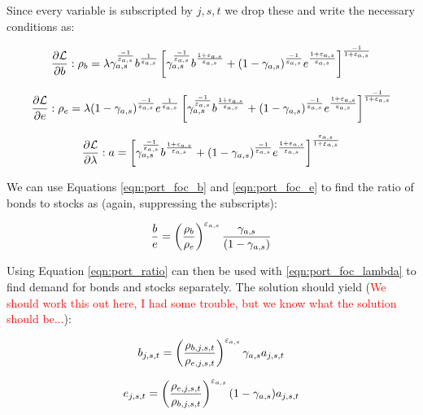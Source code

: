Since every variable is subscripted by $j,s,t$ we drop these and write the necessary conditions as:

\begin{equation}
\label{eqn:port_foc_b}
\frac{\partial \mathcal{L}}{\partial b}: \rho_{b} = \lambda \gamma_{a,s}^{\frac{-1}{\varepsilon_{a,s}}}b^{\frac{1}{\varepsilon_{a,s}}}\left[\gamma_{a,s}^{\frac{-1}{\varepsilon_{a,s}}}b^{\frac{1+\varepsilon_{a.s}}{\varepsilon_{a,s}}}+(1-\gamma_{a,s})^{\frac{-1}{\varepsilon_{a,s}}}e^{\frac{1+\varepsilon_{a,s}}{\varepsilon_{a,s}}}\right]^{\frac{-1}{1+\varepsilon_{a,s}}}
\end{equation}

\begin{equation}
\label{eqn:port_foc_e}
\frac{\partial \mathcal{L}}{\partial e}: \rho_{e} = \lambda (1- \gamma_{a,s})^{\frac{-1}{\varepsilon_{a,s}}}e^{\frac{1}{\varepsilon_{a,s}}}\left[\gamma_{a,s}^{\frac{-1}{\varepsilon_{a,s}}}b^{\frac{1+\varepsilon_{a.s}}{\varepsilon_{a,s}}}+(1-\gamma_{a,s})^{\frac{-1}{\varepsilon_{a,s}}}e^{\frac{1+\varepsilon_{a,s}}{\varepsilon_{a,s}}}\right]^{\frac{-1}{1+\varepsilon_{a,s}}}
\end{equation}
       
\begin{equation}
\label{eqn:port_foc_lambda}
\frac{\partial \mathcal{L}}{\partial \lambda}: a = \left[\gamma_{a,s}^{\frac{-1}{\varepsilon_{a,s}}}b^{\frac{1+\varepsilon_{a.s}}{\varepsilon_{a,s}}}+(1-\gamma_{a,s})^{\frac{-1}{\varepsilon_{a,s}}}e^{\frac{1+\varepsilon_{a,s}}{\varepsilon_{a,s}}}\right]^{\frac{\varepsilon_{a,s}}{1+\varepsilon_{a,s}}}
\end{equation}
              
We can use Equations \ref{eqn:port_foc_b} and \ref{eqn:port_foc_e} to find the ratio of bonds to stocks as (again, suppressing the subscripts):

\begin{equation}
\label{eqn:port_ratio}
\frac{b}{e}= \left(\frac{\rho_{b}}{\rho_{e}}\right)^{\varepsilon_{a,s}}\frac{\gamma_{a,s}}{(1-\gamma_{a,s})}
\end{equation}
     
Using Equation \ref{eqn:port_ratio} can then be used with \ref{eqn:port_foc_lambda} to find demand for bonds and stocks separately.  The solution should yield (\textcolor{red}{We should work this out here, I had some trouble, but we know what the solution should be...}):

\begin{equation}
\label{eqn:bond_demand}
b_{j,s,t} = \left(\frac{\rho_{b,j,s,t}}{\rho_{e,j,s,t}}\right)^{\varepsilon_{a,s}}\gamma_{a,s}a_{j,s,t}
\end{equation}     

\begin{equation}
\label{eqn:equity_demand}
e_{j,s,t} = \left(\frac{\rho_{e,j,s,t}}{\rho_{b,j,s,t}}\right)^{\varepsilon_{a,s}}(1-\gamma_{a,s})a_{j,s,t}
\end{equation}     

